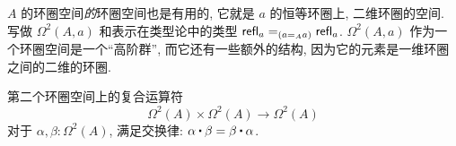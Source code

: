 $A$ 的环圈空间\emph{的}环圈空间也是有用的, 它就是 $a$ 的恒等环圈上, 二维环圈的空间.
写做 $\Omega^2(A,a)$ 和表示在类型论中的类型 $\id[({\id[A]{a}{a}})]{\refl{a}}{\refl{a}}$.
$\Omega^2(A,a)$ 作为一个环圈空间是一个``高阶群'', 而它还有一些额外的结构, 因为它的元素是一维环圈之间的二维的环圈.

\begin{thm}
    \label{thm:EckmannHilton}
    第二个环圈空间上的复合运算符
%
    \begin{equation*}
        \Omega^2(A)\times \Omega^2(A)\to \Omega^2(A)
    \end{equation*}
    对于 $\alpha, \beta:\Omega^2(A)$, 满足交换律: $\alpha\ct\beta = \beta\ct\alpha$.
\end{thm}

